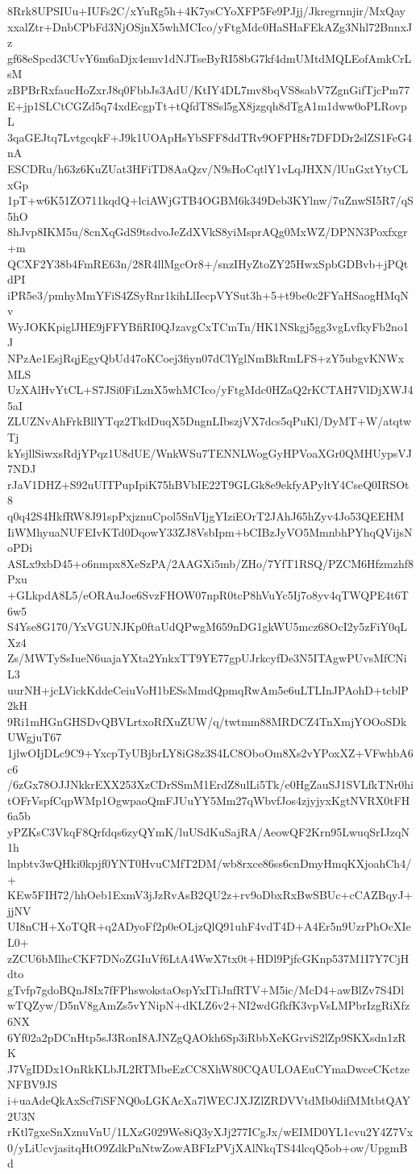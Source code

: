 8Rrk8UPSIUu+IUFs2C/xYuRg5h+4K7ysCYoXFP5Fe9PJjj/Jkregrnnjir/MxQay
xxalZtr+DnbCPbFd3NjOSjnX5whMCIco/yFtgMdc0HaSHaFEkAZg3Nhl72BnnxJz
gf68eSpcd3CUvY6m6aDjx4emv1dNJTseByRI58bG7kf4dmUMtdMQLEofAmkCrLsM
zBPBrRxfaucHoZxrJ8q0FbbJs3AdU/KtIY4DL7mv8bqVS8sabV7ZgnGifTjcPm77
E+jp1SLCtCGZd5q74xdEcgpTt+tQfdT8Ssl5gX8jzgqh8dTgA1m1dww0oPLRovpL
3qaGEJtq7LvtgcqkF+J9k1UOApHsYbSFF8ddTRv9OFPH8r7DFDDr2slZS1FeG4nA
ESCDRu/h63z6KuZUat3HFiTD8AaQzv/N9sHoCqtlY1vLqJHXN/lUnGxtYtyCLxGp
1pT+w6K51ZO711kqdQ+lciAWjGTB4OGBM6k349Deb3KYlnw/7uZnwSI5R7/qS5hO
8hJvp8IKM5u/8cnXqGdS9tsdvoJeZdXVkS8yiMsprAQg0MxWZ/DPNN3Poxfxgr+m
QCXF2Y38b4FmRE63n/28R4llMgcOr8+/snzIHyZtoZY25HwxSpbGDBvb+jPQtdPI
iPR5e3/pmhyMmYFiS4ZSyRnr1kihLlIecpVYSut3h+5+t9be0c2FYaHSaogHMqNv
WyJOKKpiglJHE9jFFYBfiRI0QJzavgCxTCmTn/HK1NSkgj5gg3vgLvfkyFb2no1J
NPzAe1EsjRqjEgyQbUd47oKCoej3fiyn07dClYglNmBkRmLFS+zY5ubgvKNWxMLS
UzXAlHvYtCL+S7JSi0FiLznX5whMCIco/yFtgMdc0HZaQ2rKCTAH7VlDjXWJ45aI
ZLUZNvAhFrkBllYTqz2TkdDuqX5DngnLIbszjVX7dcs5qPuKl/DyMT+W/atqtwTj
kYsjllSiwxsRdjYPqz1U8dUE/WnkWSu7TENNLWogGyHPVoaXGr0QMHUypsVJ7NDJ
rJaV1DHZ+S92uUITPupIpiK75hBVbIE22T9GLGk8e9ekfyAPyltY4CseQ0IRSOt8
q0q42S4HkfRW8J91spPxjznuCpol5SnVIjgYIziEOrT2JAhJ65hZyv4Jo53QEEHM
IiWMhyuaNUFEIvKTd0DqowY33ZJ8VsbIpm+bCIBzJyVO5MmnbhPYhqQVijsNoPDi
ASLx9xbD45+o6nmpx8XeSzPA/2AAGXi5mb/ZHo/7YfT1RSQ/PZCM6Hfzmzhf8Pxu
+GLkpdA8L5/eORAuJoe6SvzFHOW07npR0tcP8hVuYc5Ij7o8yv4qTWQPE4t6T6w5
S4Yse8G170/YxVGUNJKp0ftaUdQPwgM659nDG1gkWU5mcz68OcI2y5zFiY0qLXz4
Zs/MWTySsIueN6uajaYXta2YnkxTT9YE77gpUJrkcyfDe3N5ITAgwPUvsMfCNiL3
uurNH+jcLVickKddeCeiuVoH1bESsMmdQpmqRwAm5e6uLTLInJPAohD+tcblP2kH
9Ri1mHGnGHSDvQBVLrtxoRfXuZUW/q/twtmm88MRDCZ4TnXmjYOOoSDkUWgjuT67
1jlwOIjDLc9C9+YxcpTyUBjbrLY8iG8z3S4LC8OboOm8Xs2vYPoxXZ+VFwhbA6c6
/6zGx78OJJNkkrEXX253XzCDrSSmM1ErdZ8ulLi5Tk/e0HgZauSJ1SVLfkTNr0hi
tOFrVspfCqpWMp1OgwpaoQmFJUuYY5Mm27qWbvfJos4zjyjyxKgtNVRX0tFH6a5b
yPZKsC3VkqF8Qrfdqs6zyQYmK/luUSdKuSajRA/AeowQF2Krn95LwuqSrIJzqN1h
lnpbtv3wQHki0kpjf0YNT0HvuCMfT2DM/wb8rxce86ss6cnDmyHmqKXjoahCh4/+
KEw5FIH72/hhOeb1ExmV3jJzRvAsB2QU2z+rv9oDbxRxBwSBUc+cCAZBqyJ+jjNV
UI8nCH+XoTQR+q2ADyoFf2p0eOLjzQlQ91uhF4vdT4D+A4Er5n9UzrPhOcXIeL0+
zZCU6bMlhcCKF7DNoZGIuVf6LtA4WwX7tx0t+HDl9PjfcGKnp537M1I7Y7CjHdto
gTvfp7gdoBQnJ8Ix7fFPhswokstaOspYxITiJnfRTV+M5ic/McD4+awBlZv7S4Dl
wTQZyw/D5nV8gAmZs5vYNipN+dKLZ6v2+NI2wdGfkfK3vpVsLMPbrIzgRiXfz6NX
6Yf02a2pDCnHtp5sJ3RonI8AJNZgQAOkh6Sp3iRbbXeKGrviS2lZp9SKXsdn1zRK
J7VgIDDx1OnRkKLbJL2RTMbeEzCC8XhW80CQAULOAEuCYmaDwceCKctzeNFBV9JS
i+uaAdeQkAxScf7iSFNQ0oLGKAcXa7lWECJXJZlZRDVVtdMb0difMMtbtQAY2U3N
rKtl7gxeSnXznuVnU/1LXzG029We8iQ3yXJj277ICgJx/wEIMD0YL1cvu2Y4Z7Vx
0/yLiUcvjasitqHtO9ZdkPnNtwZowABFIzPVjXAlNkqTS44lcqQ5ob+ow/UpgmBd
